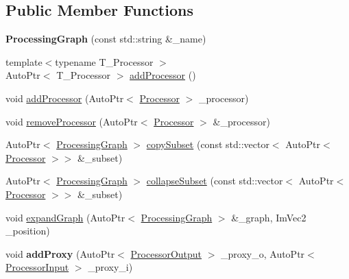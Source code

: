 \subsection*{Public Member Functions}
\begin{DoxyCompactItemize}
\item 
\mbox{\label{class_chill_1_1_processing_graph_a9fe5417596816aa6fea1c39abe9926c0}} 
{\bfseries Processing\+Graph} (const std\+::string \&\+\_\+name)
\item 
{\footnotesize template$<$typename T\+\_\+\+Processor $>$ }\\Auto\+Ptr$<$ T\+\_\+\+Processor $>$ \mbox{\hyperlink{class_chill_1_1_processing_graph_aa3bd2de51d11a08d4de2f0230f7b65d4}{add\+Processor}} ()
\item 
void \mbox{\hyperlink{class_chill_1_1_processing_graph_a066ca6f9163fe4742254b9e6e7ccc857}{add\+Processor}} (Auto\+Ptr$<$ \mbox{\hyperlink{class_chill_1_1_processor}{Processor}} $>$ \+\_\+processor)
\item 
void \mbox{\hyperlink{class_chill_1_1_processing_graph_a7fe61b40e3ef530f9684600f3a93f53f}{remove\+Processor}} (Auto\+Ptr$<$ \mbox{\hyperlink{class_chill_1_1_processor}{Processor}} $>$ \&\+\_\+processor)
\item 
Auto\+Ptr$<$ \mbox{\hyperlink{class_chill_1_1_processing_graph}{Processing\+Graph}} $>$ \mbox{\hyperlink{class_chill_1_1_processing_graph_aa57e688eefcad73aa5880afa97a4c179}{copy\+Subset}} (const std\+::vector$<$ Auto\+Ptr$<$ \mbox{\hyperlink{class_chill_1_1_processor}{Processor}} $>$$>$ \&\+\_\+subset)
\item 
Auto\+Ptr$<$ \mbox{\hyperlink{class_chill_1_1_processing_graph}{Processing\+Graph}} $>$ \mbox{\hyperlink{class_chill_1_1_processing_graph_ad7554bc478052d49fc37d8d15e29827b}{collapse\+Subset}} (const std\+::vector$<$ Auto\+Ptr$<$ \mbox{\hyperlink{class_chill_1_1_processor}{Processor}} $>$$>$ \&\+\_\+subset)
\item 
void \mbox{\hyperlink{class_chill_1_1_processing_graph_a7a7185106dc9e412a870915ee956bcca}{expand\+Graph}} (Auto\+Ptr$<$ \mbox{\hyperlink{class_chill_1_1_processing_graph}{Processing\+Graph}} $>$ \&\+\_\+graph, Im\+Vec2 \+\_\+position)
\item 
\mbox{\label{class_chill_1_1_processing_graph_a983f5286b3fff6252fb2d8226a6d5816}} 
void {\bfseries add\+Proxy} (Auto\+Ptr$<$ \mbox{\hyperlink{class_chill_1_1_processor_output}{Processor\+Output}} $>$ \+\_\+proxy\+\_\+o, Auto\+Ptr$<$ \mbox{\hyperlink{class_chill_1_1_processor_input}{Processor\+Input}} $>$ \+\_\+proxy\+\_\+i)

\end{DoxyCompactItemize}
